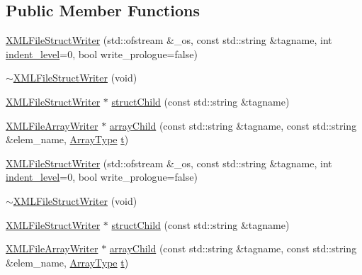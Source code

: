 \subsection*{Public Member Functions}
\begin{DoxyCompactItemize}
\item 
\mbox{\hyperlink{classXMLStructWriterAPI_1_1XMLFileStructWriter_a7045796a887cf66a8ee5a355a1f3c4a9}{X\+M\+L\+File\+Struct\+Writer}} (std\+::ofstream \&\+\_\+os, const std\+::string \&tagname, int \mbox{\hyperlink{classXMLStructWriterAPI_1_1XMLStructWriterBase_ac592a077855a1377b390f4abff506e38}{indent\+\_\+level}}=0, bool write\+\_\+prologue=false)
\item 
\mbox{\hyperlink{classXMLStructWriterAPI_1_1XMLFileStructWriter_a28ac83ac02b6b4e4e67f9a767320155d}{$\sim$\+X\+M\+L\+File\+Struct\+Writer}} (void)
\item 
\mbox{\hyperlink{classXMLStructWriterAPI_1_1XMLFileStructWriter}{X\+M\+L\+File\+Struct\+Writer}} $\ast$ \mbox{\hyperlink{classXMLStructWriterAPI_1_1XMLFileStructWriter_a29ff0f4353991294bab0c75ab8895f73}{struct\+Child}} (const std\+::string \&tagname)
\item 
\mbox{\hyperlink{classXMLStructWriterAPI_1_1XMLFileArrayWriter}{X\+M\+L\+File\+Array\+Writer}} $\ast$ \mbox{\hyperlink{classXMLStructWriterAPI_1_1XMLFileStructWriter_a45906f3eaab392974dde2da7cf1fef05}{array\+Child}} (const std\+::string \&tagname, const std\+::string \&elem\+\_\+name, \mbox{\hyperlink{namespaceXMLStructWriterAPI_a2017208be87c77a32bdc19ea2f14d032}{Array\+Type}} \mbox{\hyperlink{hadron__timeslice_8cc_ac310d9181e916ba43604099aee272c71}{t}})
\item 
\mbox{\hyperlink{classXMLStructWriterAPI_1_1XMLFileStructWriter_a7045796a887cf66a8ee5a355a1f3c4a9}{X\+M\+L\+File\+Struct\+Writer}} (std\+::ofstream \&\+\_\+os, const std\+::string \&tagname, int \mbox{\hyperlink{classXMLStructWriterAPI_1_1XMLStructWriterBase_ac592a077855a1377b390f4abff506e38}{indent\+\_\+level}}=0, bool write\+\_\+prologue=false)
\item 
\mbox{\hyperlink{classXMLStructWriterAPI_1_1XMLFileStructWriter_a28ac83ac02b6b4e4e67f9a767320155d}{$\sim$\+X\+M\+L\+File\+Struct\+Writer}} (void)
\item 
\mbox{\hyperlink{classXMLStructWriterAPI_1_1XMLFileStructWriter}{X\+M\+L\+File\+Struct\+Writer}} $\ast$ \mbox{\hyperlink{classXMLStructWriterAPI_1_1XMLFileStructWriter_a29ff0f4353991294bab0c75ab8895f73}{struct\+Child}} (const std\+::string \&tagname)
\item 
\mbox{\hyperlink{classXMLStructWriterAPI_1_1XMLFileArrayWriter}{X\+M\+L\+File\+Array\+Writer}} $\ast$ \mbox{\hyperlink{classXMLStructWriterAPI_1_1XMLFileStructWriter_a45906f3eaab392974dde2da7cf1fef05}{array\+Child}} (const std\+::string \&tagname, const std\+::string \&elem\+\_\+name, \mbox{\hyperlink{namespaceXMLStructWriterAPI_a2017208be87c77a32bdc19ea2f14d032}{Array\+Type}} \mbox{\hyperlink{hadron__timeslice_8cc_ac310d9181e916ba43604099aee272c71}{t}})
\end{DoxyCompactItemize}
